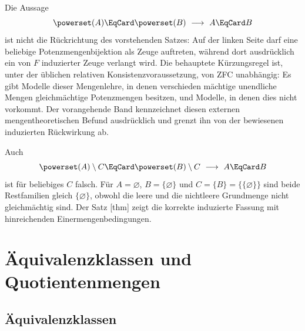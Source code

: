 \documentclass[main.tex]{subfiles}
\begin{document}
\begin{remark}
Die Aussage
\[
  \powerset(A)\EqCard\powerset(B)\ \longrightarrow\ A\EqCard B
\]
ist nicht die Rückrichtung des vorstehenden Satzes: Auf der linken Seite
darf eine beliebige Potenzmengenbijektion als Zeuge auftreten, während dort
ausdrücklich ein von \(F\) induzierter Zeuge verlangt wird.  Die behauptete
Kürzungsregel ist, unter der üblichen relativen Konsistenzvoraussetzung, von
ZFC unabhängig: Es gibt Modelle dieser Mengenlehre, in denen verschieden
mächtige unendliche Mengen gleichmächtige Potenzmengen besitzen, und Modelle,
in denen dies nicht vorkommt.  Der vorangehende Band kennzeichnet diesen
externen mengentheoretischen Befund ausdrücklich und grenzt ihn von der
bewiesenen induzierten Rückwirkung ab.

Auch
\[
  \powerset(A)\setminus C\EqCard\powerset(B)\setminus C
  \ \longrightarrow\ A\EqCard B
\]
ist für beliebiges \(C\) falsch.  Für
\(A=\varnothing\), \(B=\{\varnothing\}\) und
\(C=\{B\}=\{\{\varnothing\}\}\) sind beide Restfamilien gleich
\(\{\varnothing\}\), obwohl die leere und die nichtleere Grundmenge nicht
gleichmächtig sind.  Der Satz
[thm] zeigt die korrekte
induzierte Fassung mit hinreichenden Einermengenbedingungen.
\end{remark}

\chapter{Äquivalenzklassen und Quotientenmengen}

\section{Äquivalenzklassen}

\end{document}
